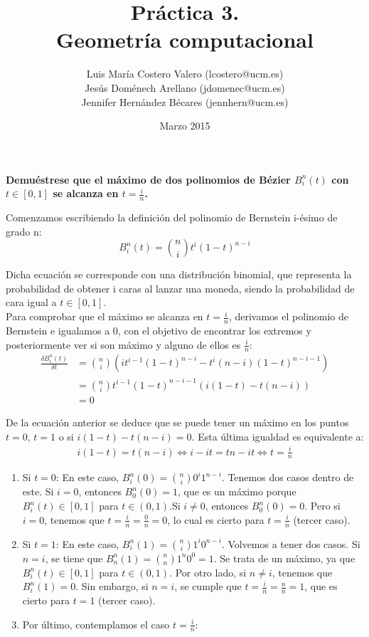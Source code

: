 \documentclass[12pt,a4paper]{article}
\title{Práctica 3. \\ Geometría computacional}
\author{Luis María Costero Valero (lcostero@ucm.es)\\ Jesús Doménech
  Arellano (jdomenec@ucm.es) \\ Jennifer Hernández Bécares (jennhern@ucm.es)}
\date{Marzo 2015}
\begin{document}
\maketitle

\textbf{Demuéstrese que el máximo de dos polinomios de Bézier $B_{i}^{n}(t)$ con $t\in \left [ 0,1 \right ] $ se alcanza en $t=\frac{i}{n}$.}

Comenzamos escribiendo la definición del polinomio de Bernstein i-ésimo de grado n: \\
\begin{equation*}
B_{i}^{n}(t) = \binom{n}{i} t^{i}(1-t)^{n-i}
\end{equation*}

Dicha ecuación se corresponde con una distribución binomial, que representa la probabilidad de obtener i caras al lanzar una moneda, siendo la probabilidad de cara igual a $t\in \left [ 0,1\right ] $. \\

Para comprobar que el máximo se alcanza en $t=\frac{i}{n}$, derivamos el polinomio de Bernstein e igualamos a 0, con el objetivo de encontrar los extremos y posteriormente ver si son máximo y alguno de ellos es $\frac{i}{n}$: \\
\begin{align*}
\frac{\delta B_i^n (t)}{\delta t} &= \binom{n}{i}(it^{i-1}(1-t)^{n-i}-t^{i}(n-i)(1-t)^{n-i-1}) \\
 &= \binom{n}{i}t^{i-1}(1-t)^{n-i-1}(i(1-t)-t(n-i)) \\
 &= 0
\end{align*}

De la ecuación anterior se deduce que se puede tener un máximo en los puntos $t=0$, $t=1$ o si $i(1-t)-t(n-i)=0$. Esta última igualdad es equivalente a:
\begin{align*}
i(1-t)=t(n-i) \Longleftrightarrow i-it=tn-it \Longleftrightarrow t=\frac{i}{n}
\end{align*}

\begin{enumerate}
\item Si $t=0$: En este caso, $B_i^n(0)=\binom{n}{i}0^i 1^{n-i}$. Tenemos dos casos dentro de este. Si $i=0$, entonces $B_0^n(0)=1$, que es un máximo porque $B_i^n(t)\in \left [ 0,1 \right ]$ para $t\in (0,1)$.Si $i\neq 0$, entonces $B_0^n(0)=0$. Pero si $i=0$, tenemos que $t=\frac{i}{n}=\frac{0}{n}=0$, lo cual es cierto para $t=\frac{i}{n}$ (tercer caso).
\item Si $t=1$: En este caso, $B_i^n(1)=\binom{n}{i}1^i 0^{n-i}$. Volvemos a tener dos casos. Si $n=i$, se tiene que $B_n^n(1) = \binom{n}{n} 1^n 0^0 = 1$. Se trata de un máximo, ya que $B_i^n(t) \in \left [ 0,1 \right ]$ para $t\in (0,1)$. Por otro lado, si $n \neq i$, tenemos que $B_i^n(1) = 0$. Sin embargo, si $n=i$, se cumple que $t=\frac{i}{n}=\frac{n}{n} = 1$, que es cierto para $t = 1$ (tercer caso).
\item Por último, contemplamos el caso $t=\frac{i}{n}$:
\end{enumerate}
\end{document}
